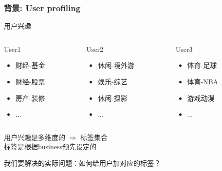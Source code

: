 \documentclass{beamer}
\begin{document}
\begin{frame}
\frametitle{背景: User profiling}
\begin{example}{用户兴趣}
  \begin{columns}

   \pause

    \begin{column}{0.333\textwidth}
      \begin{block}{User1}
      \begin{itemize}
        \item 财经-基金
        \item 财经-股票
        \item 房产-装修
        \item ...
      \end{itemize}
      \end{block}
    \end{column}

    \pause

    \begin{column}{0.333\textwidth}
      \begin{block}{User2}
      \begin{itemize}
        \item 休闲-境外游
        \item 娱乐-综艺
        \item 休闲-摄影
        \item ...
      \end{itemize}
      \end{block}
    \end{column}

    \pause

    \begin{column}{0.333\textwidth}
    \begin{block}{User3}
      \begin{itemize}
        \item 体育-足球
        \item 体育-NBA
        \item 游戏动漫
        \item ...
      \end{itemize}
      \end{block}
    \end{column}
  \end{columns}
\end{example}

\pause

用户兴趣是多维度的 $\Rightarrow$ 标签集合 \\
标签是根据business预先设定的 

\pause

\begin{block}{}
我们要解决的实际问题：如何给用户加对应的标签？
\end{block}
\end{frame}
\end{document}

